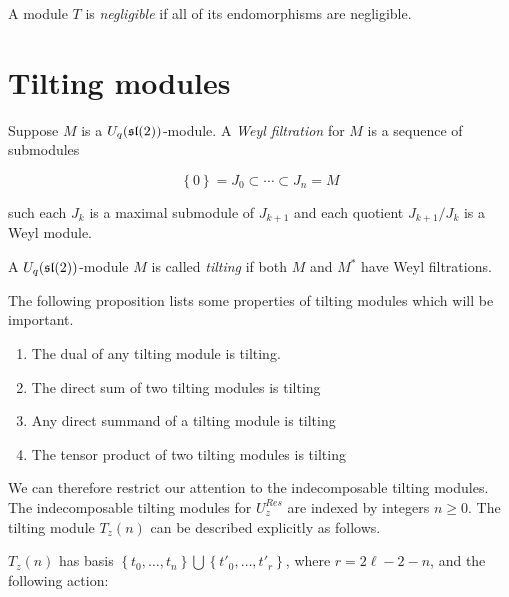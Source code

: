 \begin{defn}
    A module $T$ is \emph{negligible} if all of its endomorphisms are negligible.
\end{defn}
\section{Tilting modules} 


\begin{defn}
    Suppose $M$ is a $U_q(\mathfrak{sl}(2))$-module. A \emph{Weyl filtration} for $M$
    is a sequence of submodules 

    \begin{equation}
        \left\{ 0 \right\} = J_0 \subset \cdots \subset J_n = M
    \end{equation}

    such each $J_k$ is a maximal submodule of $J_{k+1}$ and each quotient $J_{k+1}/J_k$ is a Weyl module. 
\end{defn}

\begin{defn}
    A $U_q(\mathfrak{sl}(2))$-module $M$ is called \emph{tilting} if both $M$ and $M^*$ have Weyl filtrations.
\end{defn}

The following proposition lists some properties of tilting modules which will
be important.

\begin{prop}
\begin{enumerate}
    \renewcommand{\labelenumi}{\roman{enumi})}
    \item The dual of any tilting module is tilting.
    \item The direct sum of two tilting modules is tilting
    \item Any direct summand of a tilting module is tilting
    \item The tensor product of two tilting modules is tilting
\end{enumerate}
\end{prop}

We can therefore restrict our attention to the indecomposable tilting modules.
The indecomposable tilting modules for $U_z^{Res}$ are indexed by integers $n
\geq 0$. The tilting module $T_z(n)$ can be described explicitly as follows.

$T_z(n)$ has basis $\left\{ t_0, \ldots, t_n \right\} \bigcup \left\{ t'_0,
    \ldots, t'_{r} \right\}$, where $r = 2\ell - 2 - n$, and the following
    action:

